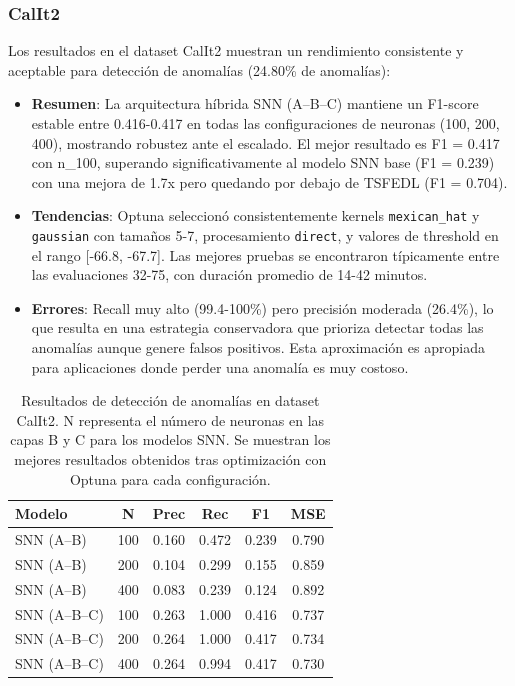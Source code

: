 \subsubsection{CalIt2}
Los resultados en el dataset CalIt2 muestran un rendimiento consistente y aceptable para detección de anomalías (24.80\% de anomalías):
\begin{itemize}
    \item \textbf{Resumen}: La arquitectura híbrida SNN (A--B--C) mantiene un F1-score estable entre 0.416-0.417 en todas las configuraciones de neuronas (100, 200, 400), mostrando robustez ante el escalado. El mejor resultado es F1 = 0.417 con n\_100, superando significativamente al modelo SNN base (F1 = 0.239) con una mejora de 1.7x pero quedando por debajo de TSFEDL (F1 = 0.704).
    \item \textbf{Tendencias}: Optuna seleccionó consistentemente kernels \texttt{mexican\_hat} y \texttt{gaussian} con tamaños 5-7, procesamiento \texttt{direct}, y valores de threshold en el rango [-66.8, -67.7]. Las mejores pruebas se encontraron típicamente entre las evaluaciones 32-75, con duración promedio de 14-42 minutos.
    \item \textbf{Errores}: Recall muy alto (99.4-100\%) pero precisión moderada (26.4\%), lo que resulta en una estrategia conservadora que prioriza detectar todas las anomalías aunque genere falsos positivos. Esta aproximación es apropiada para aplicaciones donde perder una anomalía es muy costoso.
\end{itemize}

\begin{table}[htbp]
\centering
\small
\begin{tabular}{lccccc}
\hline\hline
\textbf{Modelo} & \textbf{N} & \textbf{Prec} & \textbf{Rec} & \textbf{F1} & \textbf{MSE} \\
\hline
SNN (A--B) & 100 & 0.160 & 0.472 & 0.239 & 0.790 \\
SNN (A--B) & 200 & 0.104 & 0.299 & 0.155 & 0.859 \\
SNN (A--B) & 400 & 0.083 & 0.239 & 0.124 & 0.892 \\
\hline
SNN (A--B--C) & 100 & 0.263 & 1.000 & 0.416 & 0.737 \\
SNN (A--B--C) & 200 & 0.264 & 1.000 & 0.417 & 0.734 \\
SNN (A--B--C) & 400 & 0.264 & 0.994 & 0.417 & 0.730 \\
\hline\hline
\end{tabular}
\caption{Resultados de detección de anomalías en dataset CalIt2. N representa el número de neuronas en las capas B y C para los modelos SNN. Se muestran los mejores resultados obtenidos tras optimización con Optuna para cada configuración.}
\label{tab:resultados-iops-escalabilidad}
\end{table}



